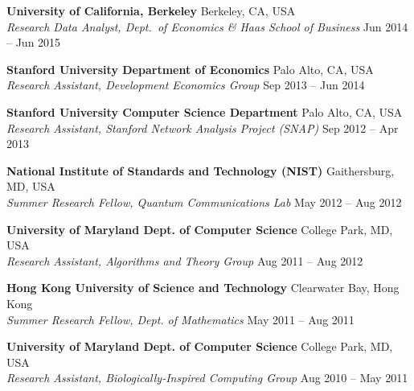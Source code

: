 \documentclass[letterpaper,11pt]{article}
\newcommand{\emplitemsep}{3mm}
\begin{document}
	\textbf{University of California, Berkeley} \hfill{} Berkeley, CA, USA\\%
	\textsl{\small Research Data Analyst, Dept.\ of Economics \& Haas School of Business} \hfill{} {\small Jun 2014 -- Jun 2015}%
    \vspace{\emplitemsep}


	\textbf{Stanford University Department of Economics} \hfill{} Palo Alto, CA, USA\\%
	\textsl{\small Research Assistant, Development Economics Group} \hfill{} {\small Sep 2013 -- Jun 2014}%
    \vspace{\emplitemsep}


	\textbf{Stanford University Computer Science Department} \hfill{} Palo Alto, CA, USA\\%
	\textsl{\small Research Assistant, Stanford Network Analysis Project (SNAP)} \hfill{} {\small Sep 2012 -- Apr 2013}%
    \vspace{\emplitemsep}


	\textbf{National Institute of Standards and Technology (NIST)} \hfill{} Gaithersburg, MD, USA\\%
	\textsl{\small Summer Research Fellow, Quantum Communications Lab} \hfill{} {\small May 2012 -- Aug 2012}%
    \vspace{\emplitemsep}


	\textbf{University of Maryland Dept. of Computer Science} \hfill{} College Park, MD, USA\\%
	\textsl{\small Research Assistant, Algorithms and Theory Group} \hfill{} {\small Aug 2011 -- Aug 2012}%
    \vspace{\emplitemsep}


	\textbf{Hong Kong University of Science and Technology} \hfill{} Clearwater Bay, Hong Kong\\%
	\textsl{\small Summer Research Fellow, Dept. of Mathematics} \hfill{} {\small May 2011 -- Aug 2011}%
    \vspace{\emplitemsep}


	\textbf{University of Maryland Dept. of Computer Science} \hfill{} College Park, MD, USA\\%
	\textsl{\small Research Assistant, Biologically-Inspired Computing Group} \hfill{} {\small Aug 2010 -- May 2011}%
    \vspace{\emplitemsep}
\end{document}
